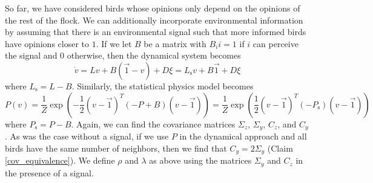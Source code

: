 \documentclass{article}
\begin{document}
So far, we have considered birds whose opinions only depend on the opinions of the rest of the flock. We can additionally incorporate environmental information by assuming that there is an environmental signal such that more informed birds have opinions closer to $1$. If we let $B$ be a matrix with $B_ii=1$ if $i$ can perceive the signal and $0$ otherwise, then the dynamical system becomes
\begin{equation}
\dot{v}=Lv+B(\vec{1}-v)+D\xi =L_\text{s}v+B\vec{1}+D\xi \label{opinion_dynamics2}
\end{equation}
where $L_\text{s}=L-B$. Similarly, the statistical physics model becomes
\begin{equation}
P(v)=\frac{1}{Z}\exp\left(-\frac{1}{2}(v-\vec{1})^T(-P+B)(v-\vec{1})\right)=\frac{1}{Z}\exp\left(\frac{1}{2}(v-\vec{1})^T(-P_\text{s})(v-\vec{1})\right)
\end{equation}
where $P_\text{s}=P-B$. Again, we can find the covariance matrices $\Sigma_z$, $\Sigma_y$, $C_z$, and $C_y$. As was the case without a signal, if we use $P$ in the dynamical approach and all birds have the same number of neighbors, then we find that $C_y=2\Sigma_y$ (Claim \ref{cov_equivalence}). We define $\rho$ and $\lambda$ as above using the matrices $\Sigma_y$ and $C_z$ in the presence of a signal.
\end{document}
